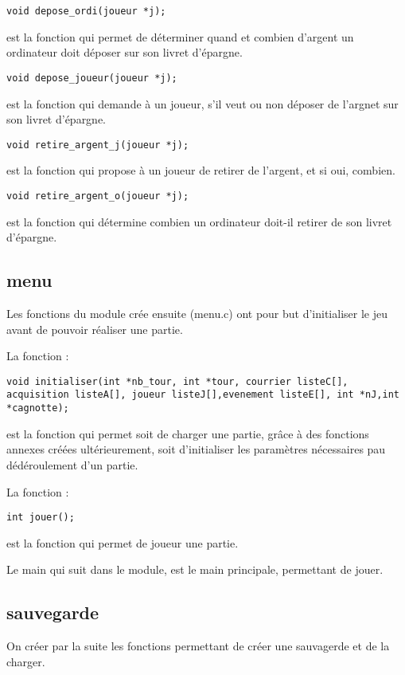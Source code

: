 \documentclass[a4paper, 11pt]{report}
\begin{document}
\begin{verbatim}
void depose_ordi(joueur *j);
\end{verbatim}
est la fonction qui permet de déterminer quand et combien d'argent un ordinateur doit déposer sur son livret d'épargne.

\begin{verbatim}
void depose_joueur(joueur *j);
\end{verbatim}
est la fonction qui demande à un joueur, s'il veut ou non déposer de l'argnet sur son livret d'épargne.

\begin{verbatim}
void retire_argent_j(joueur *j);
\end{verbatim}
est la fonction qui propose à un joueur de retirer de l'argent, et si oui, combien.

\begin{verbatim}
void retire_argent_o(joueur *j);
\end{verbatim}
est la fonction qui détermine combien un ordinateur doit-il retirer de son livret d'épargne.


\subsection{menu}
Les fonctions du module crée ensuite (menu.c) ont pour but d'initialiser le jeu avant de pouvoir réaliser une partie.

La fonction :
\begin{verbatim}
void initialiser(int *nb_tour, int *tour, courrier listeC[], acquisition listeA[], joueur listeJ[],evenement listeE[], int *nJ,int *cagnotte);
\end{verbatim}
est la fonction qui permet soit de charger une partie, grâce à des fonctions annexes créées ultérieurement, soit d'initialiser les paramètres nécessaires pau dédéroulement d'un partie.

La fonction :
\begin{verbatim}
int jouer();
\end{verbatim}
est la fonction qui permet de joueur une partie.

Le main qui suit dans le module, est le main principale, permettant de jouer.

\subsection{sauvegarde}
On créer par la suite les fonctions permettant de créer une sauvagerde et de la charger.
\end{document}
